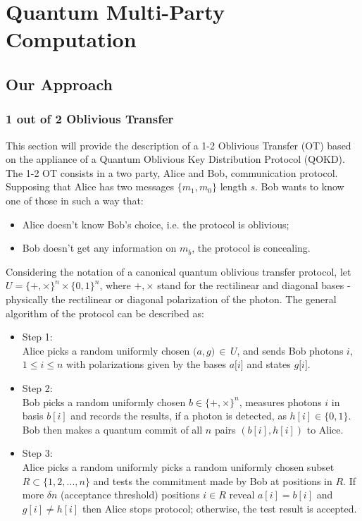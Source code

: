 \section{Quantum Multi-Party Computation}

\begin{refsection}

\subsection{Our Approach}
\subsubsection{1 out of 2 Oblivious Transfer}
This section will provide the description of a 1-2 Oblivious Transfer (OT) based on the appliance of a Quantum Oblivious Key Distribution Protocol (QOKD). The 1-2 OT consists in a two party, Alice and Bob, communication protocol. Supposing that Alice has two messages $\{m_1,m_0\}$ length $s$. Bob wants to know one of those in such a way that:
\begin{itemize}
\item Alice doesn't know Bob's choice, i.e. the protocol is oblivious;
\item Bob doesn't get any information on $m_\bar{b}$, the protocol is concealing.
\end{itemize}
Considering the notation of a canonical quantum oblivious transfer protocol, let $U=\{+,\times\}^n\times\{0,1\}^n$, where $+, \times$ stand for the rectilinear and diagonal bases - physically the rectilinear or diagonal polarization of the photon. The general algorithm of the protocol can be described as:
 \begin{itemize}
 	\item Step 1:\\
 	Alice picks a random uniformly chosen $\big(a,g\big)\,\in\,U$, and sends Bob photons $i$, $1\leq i \leq n$ with polarizations given by the bases $a\big[i\big]$ and states $g\big[i\big]$.
 	\item Step 2:\\
 	Bob picks a random uniformly chosen $b\in\{+,\times\}^n$, measures photons $i$ in basis $b\left[i\right]$ and records the results, if a photon is detected, as $h\left[i\right]\in\{0,1\}$. Bob then makes a quantum commit of all $n$ pairs $\left(b\left[i\right],h\left[i\right]\right)$ to Alice.
 	\item Step 3:\\
 	Alice picks a random uniformly picks a random uniformly chosen subset $R\subset\{1,2,...,n\}$ and tests the commitment made by Bob at positions in $R$. If more $\delta n$ (acceptance threshold) positions $i\in R$ reveal $a\left[i\right]=b\left[i\right]$ and $g\left[i\right]\neq h\left[i\right]$ then Alice stops protocol; otherwise, the test result is accepted.

\end{itemize}
\end{refsection}
